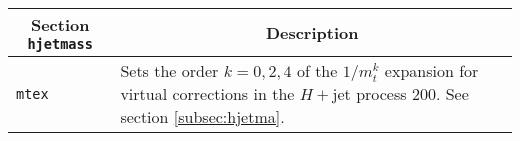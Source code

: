 	\begin{longtable}{p{1.5cm}p{12cm}}
		\hline
		\multicolumn{1}{c}{{\textbf{Section} \texttt{hjetmass}}} & \multicolumn{1}{c}{{\textbf{Description}}} \\ 
		\hline
		{\tt mtex} &
		Sets the order $k=0,2,4$ of the $1/m_t^k$ expansion for virtual corrections in the $H+$jet process 200. See 
		section \ref{subsec:hjetma}. \\
		\hline
	\end{longtable}
